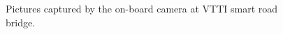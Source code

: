 \documentclass[12pt]{report}
\begin{document}
\begin{figure}[htp]
	\centering 
	\caption{Pictures captured by the on-board camera at VTTI smart road bridge.}
   \label{fig:cam_pics}
\end{figure}
\end{document}
